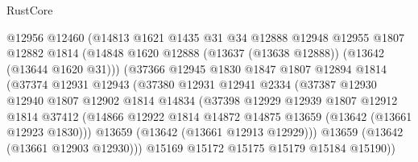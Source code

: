 \begin{lexlean}{RustCore}
\begin{coremodule}
                          @12956
                          @12460
                          (@14813
                            @1621
                            @1435
                            @31
                            @34
                            @12888
                            @12948
                            @12955
                            @1807
                            @12882
                            @1814
                            (@14848
                              @1620
                              @12888
                              (@13637 (@13638 @12888))
                              (@13642 (@13644 @1620 @31)))
                            (@37366
                              @12945
                              @1830
                              @1847
                              @1807
                              @12894
                              @1814
                              (@37374
                                @12931
                                @12943
                                (@37380
                                  @12931
                                  @12941
                                  @2334
                                  (@37387
                                    @12930
                                    @12940
                                    @1807
                                    @12902
                                    @1814
                                    @14834
                                    (@37398
                                      @12929
                                      @12939
                                      @1807
                                      @12912
                                      @1814
                                      @37412
                                      (@14866
                                        @12922
                                        @1814
                                        @14872
                                        @14875
                                        @13659
                                        (@13642 (@13661 @12923 @1830)))
                                      @13659
                                      (@13642 (@13661 @12913 @12929)))
                                    @13659
                                    (@13642 (@13661 @12903 @12930)))
                                  @15169
                                  @15172
                                  @15175
                                  @15179
                                  @15184
                                  @15190))

\end{coremodule}
\end{lexlean}
